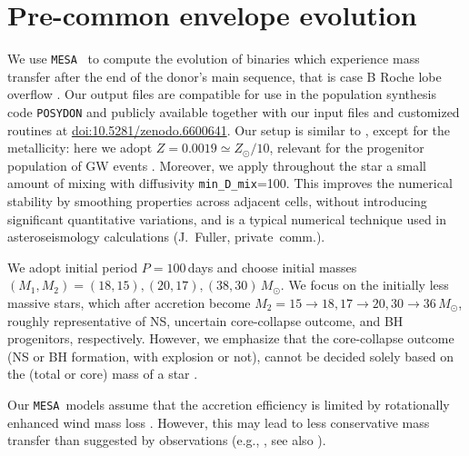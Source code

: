 \documentclass[twocolumn,twocolappendix,trackchanges]{aastex63}
\newcommand{\code}[1]{\texttt{#1}}
\newcommand{\mesa}{\code{MESA}}
\begin{document}
\section{Pre-common envelope evolution}
\label{sec:methods}

We use \mesa\ \citep[version 15140,][]{paxton:2011, paxton:2013,
  paxton:2015, paxton:2018, paxton:2011} to compute the evolution of
binaries which experience mass transfer after the end of the donor's
main sequence, that is case B Roche lobe overflow
\citep[RLOF,][]{kippenhahn:1967}. Our output files are compatible for
use in the population synthesis code \code{POSYDON}
\citep{fragos:2022} and publicly available together with our input
files and customized routines at \href{https://zenodo.org/deposit/6600641}{doi:10.5281/zenodo.6600641}. Our
setup is similar to \cite{renzo:2021zoph}, except for the metallicity:
here we adopt $Z=0.0019\simeq Z_\odot/10$, relevant for the progenitor
population of GW events \citep[e.g.,][]{vanson:2021}. Moreover, we
apply throughout the star a small amount of mixing with diffusivity
\texttt{min\_D\_mix}=100. This improves the numerical stability by
smoothing properties across adjacent cells, without introducing
significant quantitative variations, and is a typical numerical
technique used in asteroseismology calculations (J.~Fuller,
private~comm.).

We adopt initial period $P=100$\,days and choose initial masses
$(M_{1}, M_{2}) = (18, 15), (20, 17), (38, 30)\,M_\odot$. We focus on
the initially less massive stars, which after accretion become
$M_2=15\rightarrow 18, 17\rightarrow 20, 30\rightarrow 36\,M_\odot$,
roughly representative of NS, uncertain core-collapse outcome, and BH
progenitors, respectively. However, we emphasize that the
core-collapse outcome (NS or BH formation, with explosion or not),
cannot be decided solely based on the (total or core) mass of a star
\citep[e.g.,][]{oconnor:11, farmer:16, patton:20, zapartas:21b,
  patton:22}.

Our \mesa\ models assume that the
accretion efficiency is limited by rotationally enhanced wind mass
loss \citep[e.g.,][]{sravan:2019, wang:2020, renzo:2021zoph,
  sen:2022}. However, this may lead to less conservative mass transfer
than suggested by observations (e.g., \citealt{wang:2021a}, see also
\citealt{renzo:2021zoph}).
\end{document}
